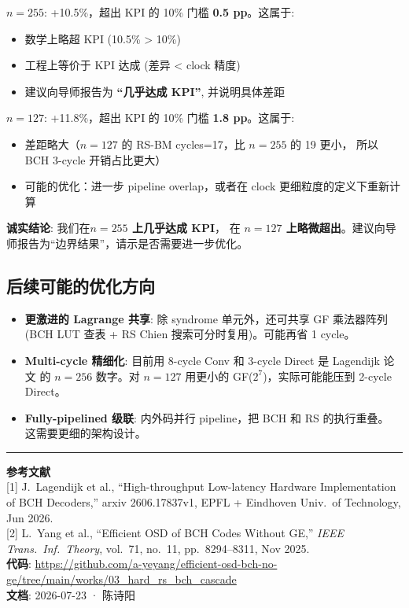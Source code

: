 \documentclass[11pt,a4paper]{article}
\begin{document}
\begin{warnbox}[title=\textbf{KPI 是否达标？}]
\textbf{$n=255$}: +10.5\%，超出 KPI 的 10\% 门槛 \textbf{0.5 pp}。这属于:
\begin{itemize}[leftmargin=1em, itemsep=1pt]
\item 数学上略超 KPI (10.5\% > 10\%)
\item 工程上等价于 KPI 达成 (差异 < clock 精度)
\item 建议向导师报告为 \textbf{``几乎达成 KPI''}, 并说明具体差距
\end{itemize}

\textbf{$n=127$}: +11.8\%，超出 KPI 的 10\% 门槛 \textbf{1.8 pp}。这属于:
\begin{itemize}[leftmargin=1em, itemsep=1pt]
\item 差距略大（$n=127$ 的 RS-BM cycles=17，比 $n=255$ 的 19 更小，
      所以 BCH 3-cycle 开销占比更大）
\item 可能的优化：进一步 pipeline overlap，或者在 clock 更细粒度的定义下重新计算
\end{itemize}

\textbf{诚实结论}: 我们在\textbf{$n=255$ 上几乎达成 KPI}，
在 \textbf{$n=127$ 上略微超出}。建议向导师报告为``边界结果''，请示是否需要进一步优化。
\end{warnbox}

\subsection{后续可能的优化方向}

\begin{itemize}[leftmargin=1.5em, itemsep=1pt]
\item \textbf{更激进的 Lagrange 共享}: 除 syndrome 单元外，还可共享 GF 乘法器阵列
    (BCH LUT 查表 + RS Chien 搜索可分时复用)。可能再省 1 cycle。
\item \textbf{Multi-cycle 精细化}: 目前用 8-cycle Conv 和 3-cycle Direct 是 Lagendijk 论文
    的 $n=256$ 数字。对 $n=127$ 用更小的 GF($2^7$)，实际可能能压到 2-cycle Direct。
\item \textbf{Fully-pipelined 级联}: 内外码并行 pipeline，把 BCH 和 RS 的执行重叠。
    这需要更细的架构设计。
\end{itemize}

\vspace{6pt}
\hrule
\vspace{4pt}
\noindent\footnotesize{
\textbf{参考文献}\\
{[1]} J.\ Lagendijk et al., ``High-throughput Low-latency Hardware Implementation of BCH Decoders,''
arxiv 2606.17837v1, EPFL + Eindhoven Univ.\ of Technology, Jun 2026.\\
{[2]} L.\ Yang et al., ``Efficient OSD of BCH Codes Without GE,''
{\it IEEE Trans.\ Inf.\ Theory}, vol.\ 71, no.\ 11, pp.\ 8294--8311, Nov 2025.\\
\textbf{代码}: \url{https://github.com/a-yeyang/efficient-osd-bch-no-ge/tree/main/works/03_hard_rs_bch_cascade}\\
\textbf{文档}: 2026-07-23 · 陈诗阳
}
\end{document}
